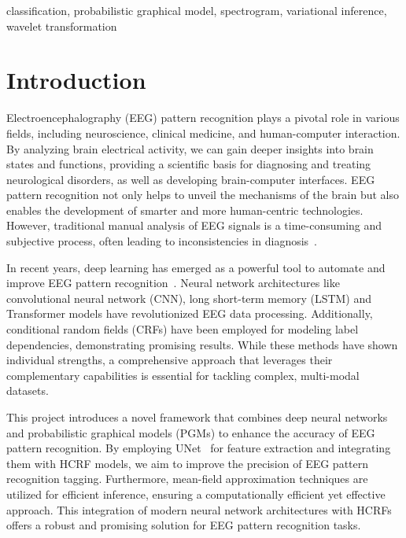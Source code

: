 \documentclass[conference]{IEEEtran}
\begin{document}
\begin{IEEEkeywords}


classification, probabilistic graphical model, spectrogram,
variational inference, wavelet transformation


\end{IEEEkeywords}


\section{Introduction}


Electroencephalography (EEG) pattern recognition plays a pivotal role in
various fields, including neuroscience, clinical medicine, and human-computer
interaction. By analyzing brain electrical activity, we can gain deeper
insights into brain states and functions, providing a scientific basis for
diagnosing and treating neurological disorders, as well as developing
brain-computer interfaces. EEG pattern recognition not only helps to unveil the
mechanisms of the brain but also enables the development of smarter and more
human-centric technologies. However, traditional manual analysis of EEG signals
is a time-consuming and subjective process, often leading to inconsistencies in
diagnosis~\citep{liu2013recognizing}.


In recent years, deep learning has emerged as a powerful tool to automate and
improve EEG pattern recognition~\citep{craik2019deep}. Neural network
architectures like convolutional neural network (CNN), long short-term memory
(LSTM) and Transformer models have revolutionized EEG data processing.
Additionally, conditional random fields (CRFs) have been employed for
modeling label dependencies, demonstrating promising results.
While these methods have shown individual strengths, a comprehensive
approach that leverages their complementary capabilities is essential for
tackling complex, multi-modal datasets.


This project introduces a novel framework that combines deep neural networks
and probabilistic graphical models (PGMs) to enhance the accuracy of EEG
pattern recognition. By employing UNet~\citep{ronneberger2015unet} for feature
extraction and integrating them with HCRF models, we aim to improve the
precision of EEG pattern recognition tagging. Furthermore, mean-field
approximation techniques are utilized for efficient inference, ensuring a
computationally efficient yet effective approach.
This integration of modern neural network architectures with HCRFs offers
a robust and promising solution for EEG pattern recognition tasks.
\end{document}
